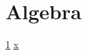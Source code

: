 \section{Algebra}\label{subject3}\hypertarget{s9}{}

\ref{subject3} \pageref{subject3} \hyperlink{s9}{x}
